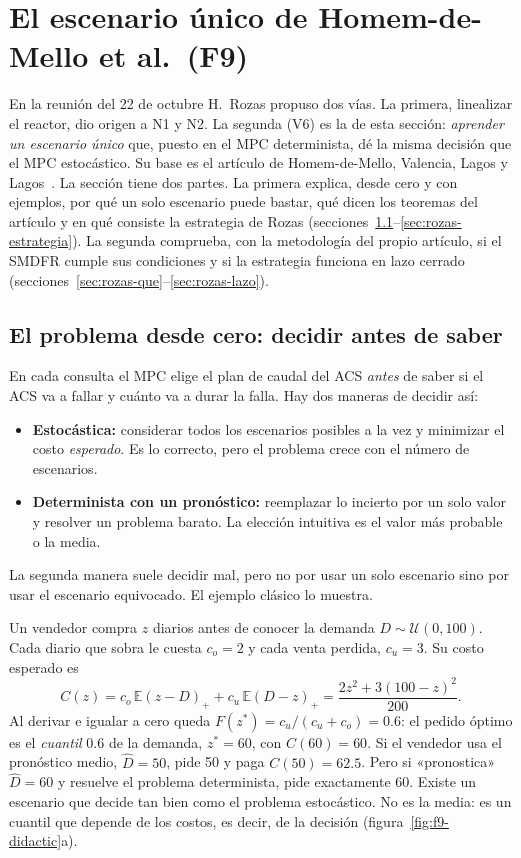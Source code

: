 \section{El escenario único de Homem-de-Mello et al.\ (F9)}\label{sec:rozas}
En la reunión del 22 de octubre H.~Rozas propuso dos vías. La primera, linealizar el reactor,
dio origen a N1 y N2. La segunda (V6) es la de esta sección: \emph{aprender un escenario único}
que, puesto en el MPC determinista, dé la misma decisión que el MPC estocástico. Su base es el
artículo de Homem-de-Mello, Valencia, Lagos y Lagos~\cite{homem2026}. La sección tiene dos
partes. La primera explica, desde cero y con ejemplos, por qué un solo escenario puede bastar,
qué dicen los teoremas del artículo y en qué consiste la estrategia de Rozas
(secciones~\ref{sec:rozas-problema}--\ref{sec:rozas-estrategia}). La segunda comprueba, con la
metodología del propio artículo, si el SMDFR cumple sus condiciones y si la estrategia funciona
en lazo cerrado (secciones~\ref{sec:rozas-que}--\ref{sec:rozas-lazo}).

\subsection{El problema desde cero: decidir antes de saber}\label{sec:rozas-problema}
En cada consulta el MPC elige el plan de caudal del ACS \emph{antes} de saber si el ACS va a
fallar y cuánto va a durar la falla. Hay dos maneras de decidir así:
\begin{itemize}
  \item \textbf{Estocástica:} considerar todos los escenarios posibles a la vez y minimizar el
        costo \emph{esperado}. Es lo correcto, pero el problema crece con el número de escenarios.
  \item \textbf{Determinista con un pronóstico:} reemplazar lo incierto por un solo valor y
        resolver un problema barato. La elección intuitiva es el valor más probable o la media.
\end{itemize}
La segunda manera suele decidir mal, pero no por usar un solo escenario sino por usar el
escenario equivocado. El ejemplo clásico lo muestra.

\begin{ejemplo}
Un vendedor compra $z$ diarios antes de conocer la demanda $D\sim\mathcal U(0,100)$. Cada
diario que sobra le cuesta $c_o=2$ y cada venta perdida, $c_u=3$. Su costo esperado es
\[
C(z)=c_o\,\mathbb E(z-D)_+ + c_u\,\mathbb E(D-z)_+=\frac{2z^2+3(100-z)^2}{200}.
\]
Al derivar e igualar a cero queda $F(z^*)=c_u/(c_u+c_o)=0.6$: el pedido óptimo es el
\emph{cuantil} 0.6 de la demanda, $z^*=60$, con $C(60)=60$. Si el vendedor usa el pronóstico
medio, $\hat D=50$, pide 50 y paga $C(50)=62.5$. Pero si «pronostica» $\hat D=60$ y resuelve el
problema determinista, pide exactamente 60. Existe un escenario que decide tan bien como el
problema estocástico. No es la media: es un cuantil que depende de los costos, es decir, de la
decisión (figura~\ref{fig:f9-didactic}a).
\end{ejemplo}

